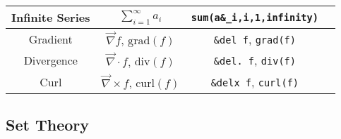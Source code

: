 \documentclass{article}
\begin{document}
\begin{table}[!h]
\begin{tabular}{|c|c|c|l|}
      Infinite Series & \( \displaystyle \sum_{i=1}^\infty a_i \) & \texttt{sum(a\&\_i,i,1,infinity)} & \\[4pt]
      \hline
      Gradient & \( \vec{\nabla} f \), \( \mathrm{grad}(f) \) & \texttt{\&del f}, \texttt{grad(f)} & \\
      Divergence & \( \vec{\nabla} \cdot f \), \( \mathrm{div}(f) \) & \texttt{\&del.~f}, \texttt{div(f)} & \\
      Curl & \( \vec{\nabla} \times f \), \( \mathrm{curl}(f) \) & \texttt{\&delx f}, \texttt{curl(f)} & \\
      \hline
    \end{tabular}
  \end{table}

  \newpage

  \subsection{Set Theory} %
  \label{sub:settheory}
\end{document}
